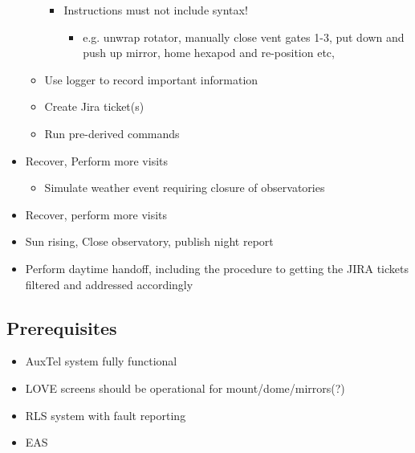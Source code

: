 \begin{itemize}
\begin{itemize}
    \begin{itemize}
    \item Instructions must not include syntax!
      \begin{itemize}
      \item e.g. unwrap rotator, manually close vent gates 1-3, put down and push up mirror, home hexapod and re-position etc,
      \end{itemize}
    \end{itemize}
  \item Use logger to record important information
  \item Create Jira ticket(s)
  \item Run pre-derived commands
  \end{itemize}
\item Recover, Perform more visits
  \begin{itemize}
  \item Simulate weather event requiring closure of observatories
  \end{itemize}
\item Recover, perform more visits
\item Sun rising, Close observatory, publish night report
\item Perform daytime handoff, including the procedure to getting the JIRA tickets filtered and addressed accordingly
\end{itemize}

\subsection{Prerequisites}
\begin{itemize}
\item AuxTel system fully functional
\item LOVE screens should be operational for mount/dome/mirrors(?)
\item RLS system with fault reporting
\item EAS
\end{itemize}
